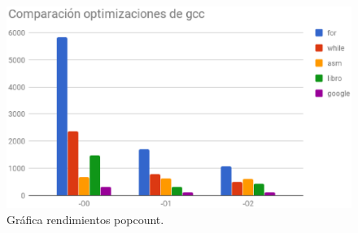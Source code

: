 \documentclass{article}
\begin{document}
  \begin{figure}[H]
    \centering
    \includegraphics[width=\textwidth,height=\textheight,keepaspectratio]{popcount.eps}
    \caption{Gráfica rendimientos popcount.}
  \end{figure}
\end{document}
